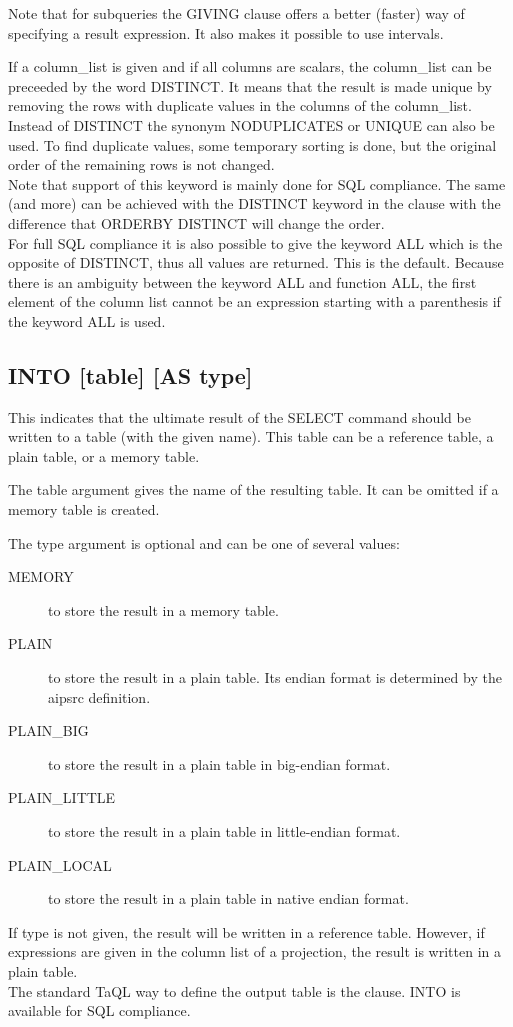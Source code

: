 Note that for subqueries the GIVING clause offers a
better (faster) way of specifying a result expression. It also makes it
possible to use intervals.

If a column\_list is given and if all columns are scalars, the
column\_list can be preceeded by the word DISTINCT.
It means that the result is made unique by removing the rows
with duplicate values in the columns of the column\_list.
Instead of DISTINCT the synonym NODUPLICATES or UNIQUE can also
be used.
To find duplicate values, some temporary sorting is done,
but the original order of the remaining rows is not changed.
\\Note that support of this keyword is mainly done for SQL
compliance. The same (and more) can be achieved with the
DISTINCT keyword in the  clause
with the difference that ORDERBY DISTINCT will change the order.
\\For full SQL compliance it is also possible to give the keyword
ALL which is the opposite of DISTINCT, thus all values are
returned. This is the default. Because there is an ambiguity between
the keyword ALL and function ALL, the first element of the column
list cannot be an expression starting with a parenthesis if the
keyword ALL is used.

\subsection{\label{TAQL:INTO}INTO [table] [AS type]}
This indicates that the ultimate result of the SELECT command should be
written to a table (with the given name). This table can be a
reference table, a plain table, or a memory table.

The table argument gives the name of the resulting table. It can be
omitted if a memory table is created.

The type argument is optional and can be one of several values:
\begin{description}
  \item[MEMORY ]to store the result in a memory table.
  \item[PLAIN ]to store the result in a plain table. Its endian format
is determined by the aipsrc definition.
  \item[PLAIN\_BIG ]to store the result in a plain table in big-endian format.
  \item[PLAIN\_LITTLE ]to store the result in a plain table in little-endian format.
  \item[PLAIN\_LOCAL ]to store the result in a plain table in native endian format.
\end{description}
If type is not given, the result will be written in a reference table.
However, if expressions are given in the column list of a projection,
the result is written in a plain table.
\\The standard TaQL way to define the output table is the
 clause. INTO is available
for SQL compliance.

